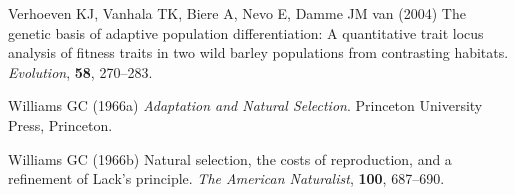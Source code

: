 \documentclass[12pt,]{article}
\begin{document}
\leavevmode\hypertarget{ref-Verhoeven2004}{}%
Verhoeven KJ, Vanhala TK, Biere A, Nevo E, Damme JM van (2004) The genetic basis of adaptive population differentiation: A quantitative trait locus analysis of fitness traits in two wild barley populations from contrasting habitats. \emph{Evolution}, \textbf{58}, 270--283.

\leavevmode\hypertarget{ref-Williams1966}{}%
Williams GC (1966a) \emph{Adaptation and Natural Selection}. Princeton University Press, Princeton.

\leavevmode\hypertarget{ref-Williams1966a}{}%
Williams GC (1966b) Natural selection, the costs of reproduction, and a refinement of Lack's principle. \emph{The American Naturalist}, \textbf{100}, 687--690.
\end{document}
